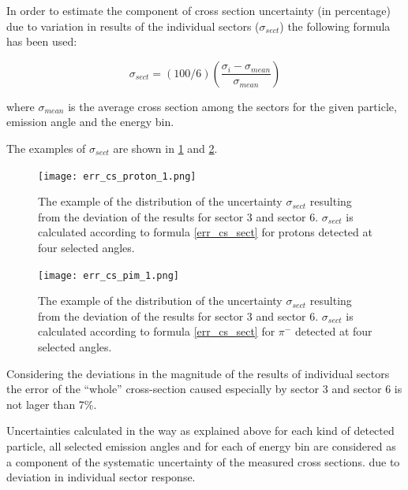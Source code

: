 In order to estimate the component of cross section uncertainty (in percentage) due to variation in results of the individual sectors ($\sigma_{sect}$) the following formula has been used: 

\begin{equation}
\label{err_cs_sect}
\sigma_{sect} = (100/6) (\frac{\sigma_i - \sigma_{mean}}{\sigma_{mean}})    
\end{equation}
 
where $\sigma_{mean}$ is the average cross section among the sectors for the given particle, emission angle and the energy bin. 

The examples of $\sigma_{sect}$ are shown in 
\ref{error_cs_proton} and \ref{error_cs_pim}. 

\begin{figure}
    \centering
    \texttt{[image: err\_cs\_proton\_1.png]}%
    \caption{The example of the distribution of the uncertainty $\sigma_{sect}$ resulting from the deviation of the results for sector 3 and sector 6.
    $\sigma_{sect}$ is calculated according to formula \ref{err_cs_sect} for protons detected at four selected angles.}
    \label{error_cs_proton}
\end{figure}
 
\begin{figure}
    \centering
    \texttt{[image: err\_cs\_pim\_1.png]}%
    \caption{The example of the distribution of the uncertainty $\sigma_{sect}$ resulting from the deviation of the results for sector 3 and sector 6.
    $\sigma_{sect}$ is calculated according to formula \ref{err_cs_sect} for $\pi^{-}$ detected at four selected angles.}
    \label{error_cs_pim}
\end{figure} 

Considering the deviations in the magnitude of the results of individual sectors the error of the “whole” cross-section caused especially by sector 3 and sector 6 is not lager than 7\%. 

Uncertainties calculated in the way as explained above for each kind of detected particle, all selected emission angles and for 
each of energy bin
are considered as a component of the systematic uncertainty of the measured cross sections.
due to deviation in individual sector response.




 

